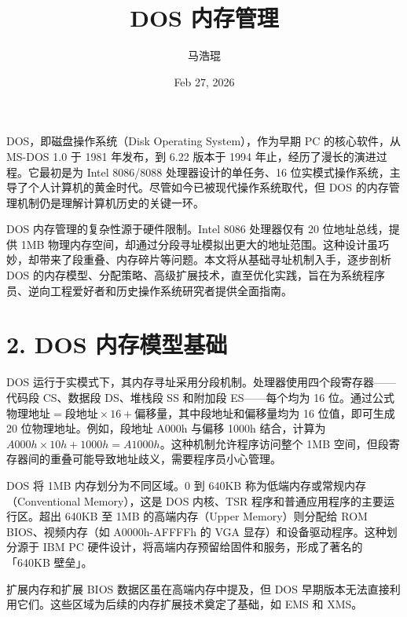 \title{DOS 内存管理}
\author{马浩琨}
\date{Feb 27, 2026}
\maketitle
DOS，即磁盘操作系统（Disk Operating System），作为早期 PC 的核心软件，从 MS-DOS 1.0 于 1981 年发布，到 6.22 版本于 1994 年止，经历了漫长的演进过程。它最初是为 Intel 8086/8088 处理器设计的单任务、16 位实模式操作系统，主导了个人计算机的黄金时代。尽管如今已被现代操作系统取代，但 DOS 的内存管理机制仍是理解计算机历史的关键一环。\par
DOS 内存管理的复杂性源于硬件限制。Intel 8086 处理器仅有 20 位地址总线，提供 1MB 物理内存空间，却通过分段寻址模拟出更大的地址范围。这种设计虽巧妙，却带来了段重叠、内存碎片等问题。本文将从基础寻址机制入手，逐步剖析 DOS 的内存模型、分配策略、高级扩展技术，直至优化实践，旨在为系统程序员、逆向工程爱好者和历史操作系统研究者提供全面指南。\par
\chapter{2. DOS 内存模型基础}
DOS 运行于实模式下，其内存寻址采用分段机制。处理器使用四个段寄存器——代码段 CS、数据段 DS、堆栈段 SS 和附加段 ES——每个均为 16 位。通过公式 $物理地址 = 段地址 \times 16 + 偏移量$，其中段地址和偏移量均为 16 位值，即可生成 20 位物理地址。例如，段地址 A000h 与偏移 1000h 结合，计算为 $A000h \times 10h + 1000h = A1000h$。这种机制允许程序访问整个 1MB 空间，但段寄存器间的重叠可能导致地址歧义，需要程序员小心管理。\par
DOS 将 1MB 内存划分为不同区域。0 到 640KB 称为低端内存或常规内存（Conventional Memory），这是 DOS 内核、TSR 程序和普通应用程序的主要运行区。超出 640KB 至 1MB 的高端内存（Upper Memory）则分配给 ROM BIOS、视频内存（如 A0000h-AFFFFh 的 VGA 显存）和设备驱动程序。这种划分源于 IBM PC 硬件设计，将高端内存预留给固件和服务，形成了著名的「640KB 壁垒」。\par
扩展内存和扩展 BIOS 数据区虽在高端内存中提及，但 DOS 早期版本无法直接利用它们。这些区域为后续的内存扩展技术奠定了基础，如 EMS 和 XMS。\par
